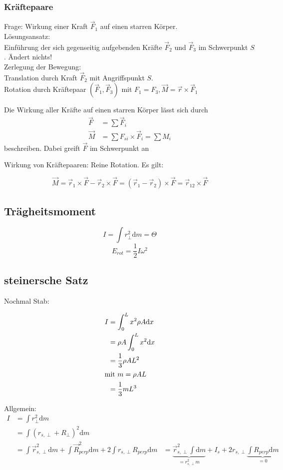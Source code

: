 \documentclass[a4paper]{scrartcl}
\renewcommand{\d}{\mathrm{d}}
\renewcommand{\v}[1]{\vec{#1}}
\theoremstyle{definition}
\theoremstyle{plain}
\theoremstyle{plain}
\theoremstyle{remark}
\theoremstyle{remark}
\theoremstyle{remark}
\begin{document}
\subsubsection{Kräftepaare}
\label{sec-8-2-2}
Frage: Wirkung einer Kraft $\v F_1$ auf einen starren Körper. \\
    Lösungsansatz: \\
    Einführung der sich gegenseitig aufgebenden Kräfte $\v F_2$ und $\v F_3$ im Schwerpunkt $S$. Ändert nichts! \\
    Zerlegung der Bewegung: \\
    Translation durch Kraft $\v F_2$ mit Angriffspunkt $S$. \\
    Rotation durch Kräftepaar $(\v F_1, \v F_3)$ mit $F_1 = F_3, \v M = \v r \times \v F_1$

Die Wirkung aller Kräfte auf einen starren Körper lässt sich durch
\begin{align*}
\v F &= \sum \v F_i \tag{Gesamtkraft (Gesamtkraft)} \\
\v M &= \sum F_{si} \times \v F_i = \sum M_i \tag{Gesamtdrehmoment (Rotation)}
\end{align*}
beschreiben. Dabei greift $\v F$ im Schwerpunkt an

Wirkung von Kräftepaaren: Reine Rotation. Es gilt:

\[\v M = \v r_1 \times \v F - \v r_2 \times \v F = (\v r_1 - \v r_2)\times \v F = \v r_{12} \times \v F\]
\subsection{Trägheitsmoment}
\label{sec-8-3}
\[I = \int r^2_\perp \d m = \Theta\]
\[E_{rot} = \frac{1}{2} I \omega^2\]

\subsection{steinersche Satz}
\label{sec-8-4}
Nochmal Stab:

\begin{align*}
I &= \int_0^L x^2 \rho A \d x \\
&= \rho A \int_0^L x^2 \d x \\
&= \frac{1}{3}\rho A L^2 \\
\intertext{mit $m = \rho A L$}
&= \frac{1}{3} m L^3
\end{align*}


Allgemein:
\begin{align*}
I &= \int r_\perp^2 \d m \\
&= \int (r_{s,\perp} + R_\perp)^2 \d m \\
&= \int \v r_{s,\perp}^2 \d m + \int \v R_{perp}^2 \d m + 2\int r_{s,\perp} R_{perp} \d m
&= \underbrace{\v r_{s,\perp}^2 \int  \d m}_{ = r_{s,\perp}^2 m} + I_s +  2r_{s,\perp} \underbrace{\int R_{perp} \d m}_{ = 0}
\end{align*}
\end{document}
